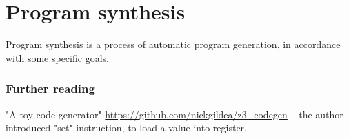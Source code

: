 \chapter{Program synthesis}

Program synthesis is a process of automatic program generation, in accordance with some specific goals.






\subsection{Further reading}

"A toy code generator" \url{https://github.com/nickgildea/z3_codegen} -- the author introduced "set" instruction,
to load a value into register.

